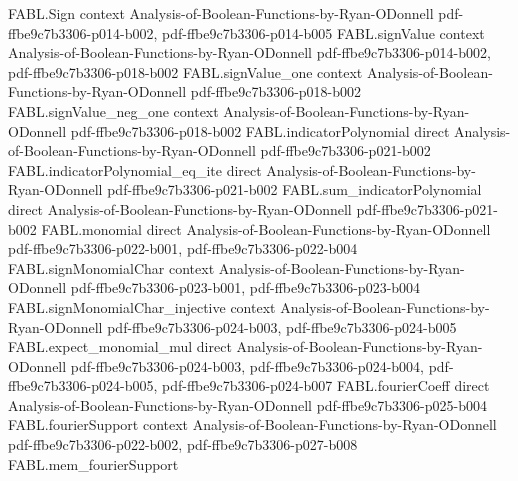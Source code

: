 \begin{theorem}
\label{FABL.fourierWeightAtLevel_majority_odd_strictAnti_and_tendsto}
\leanok
{}
\proofstep
  {FABL.Sign}
  {context}
  {Analysis-of-Boolean-Functions-by-Ryan-ODonnell}
  {pdf-ffbe9c7b3306-p014-b002,
    pdf-ffbe9c7b3306-p014-b005}
\proofstep
  {FABL.signValue}
  {context}
  {Analysis-of-Boolean-Functions-by-Ryan-ODonnell}
  {pdf-ffbe9c7b3306-p014-b002,
    pdf-ffbe9c7b3306-p018-b002}
\proofstep
  {FABL.signValue_one}
  {context}
  {Analysis-of-Boolean-Functions-by-Ryan-ODonnell}
  {pdf-ffbe9c7b3306-p018-b002}
\proofstep
  {FABL.signValue_neg_one}
  {context}
  {Analysis-of-Boolean-Functions-by-Ryan-ODonnell}
  {pdf-ffbe9c7b3306-p018-b002}
\proofstep
  {FABL.indicatorPolynomial}
  {direct}
  {Analysis-of-Boolean-Functions-by-Ryan-ODonnell}
  {pdf-ffbe9c7b3306-p021-b002}
\proofstep
  {FABL.indicatorPolynomial_eq_ite}
  {direct}
  {Analysis-of-Boolean-Functions-by-Ryan-ODonnell}
  {pdf-ffbe9c7b3306-p021-b002}
\proofstep
  {FABL.sum_indicatorPolynomial}
  {direct}
  {Analysis-of-Boolean-Functions-by-Ryan-ODonnell}
  {pdf-ffbe9c7b3306-p021-b002}
\proofstep
  {FABL.monomial}
  {direct}
  {Analysis-of-Boolean-Functions-by-Ryan-ODonnell}
  {pdf-ffbe9c7b3306-p022-b001,
    pdf-ffbe9c7b3306-p022-b004}
\proofstep
  {FABL.signMonomialChar}
  {context}
  {Analysis-of-Boolean-Functions-by-Ryan-ODonnell}
  {pdf-ffbe9c7b3306-p023-b001,
    pdf-ffbe9c7b3306-p023-b004}
\proofstep
  {FABL.signMonomialChar_injective}
  {context}
  {Analysis-of-Boolean-Functions-by-Ryan-ODonnell}
  {pdf-ffbe9c7b3306-p024-b003,
    pdf-ffbe9c7b3306-p024-b005}
\proofstep
  {FABL.expect_monomial_mul}
  {direct}
  {Analysis-of-Boolean-Functions-by-Ryan-ODonnell}
  {pdf-ffbe9c7b3306-p024-b003,
    pdf-ffbe9c7b3306-p024-b004,
    pdf-ffbe9c7b3306-p024-b005,
    pdf-ffbe9c7b3306-p024-b007}
\proofstep
  {FABL.fourierCoeff}
  {direct}
  {Analysis-of-Boolean-Functions-by-Ryan-ODonnell}
  {pdf-ffbe9c7b3306-p025-b004}
\proofstep
  {FABL.fourierSupport}
  {context}
  {Analysis-of-Boolean-Functions-by-Ryan-ODonnell}
  {pdf-ffbe9c7b3306-p022-b002,
    pdf-ffbe9c7b3306-p027-b008}
\proofstep
  {FABL.mem_fourierSupport}

\end{theorem}

